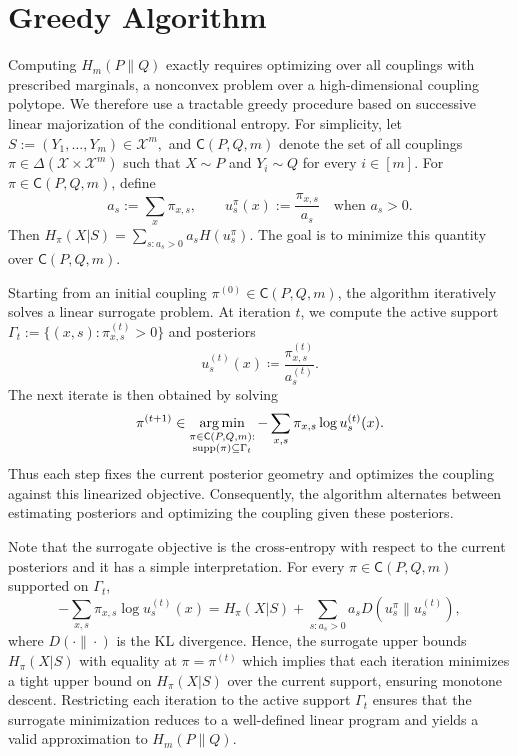 \documentclass[journal]{IEEEtran}
\def\argmin{\mathop{\rm arg\, min}}
\def\supp{\mathop{\rm supp}}
\def\argmin{\mathop{\rm arg\, min}}
\newcommand{\1}{\mathbf{1}}
\begin{document}
\section{Greedy Algorithm}
\label{sec:Hstar-algorithm}
Computing $H_m(P\|Q)$ exactly requires optimizing over all couplings with
prescribed marginals, a nonconvex problem over a high-dimensional coupling
polytope. We therefore use a tractable greedy procedure based on successive
linear majorization of the conditional entropy.
For simplicity, let \(S:=(Y_1,\ldots,Y_m)\in\mathcal X^m,\) and $\mathsf C(P,Q,m)$ denote the set of all couplings $\pi\in\Delta(\mathcal X\times\mathcal X^m)$ such that $X\sim P$ and $Y_i\sim Q$ for every $i\in[m]$. For $\pi\in\mathsf C(P,Q,m)$, define
\[a_s:=\sum_x\pi_{x,s},
\qquad u_s^\pi(x):=\frac{\pi_{x,s}}{a_s}
\quad\text{when }a_s>0.\]
Then \(H_\pi(X|S)=\sum_{s:a_s>0}a_sH(u_s^\pi).\) The goal is to minimize this quantity over $\mathsf C(P,Q,m)$.

Starting from an initial coupling $\pi^{(0)}\in\mathsf C(P,Q,m)$, the algorithm
iteratively solves a linear surrogate problem. At iteration $t$, we compute the active support \(\Gamma_t:=\{(x,s):\pi^{(t)}_{x,s}>0\}\) and posteriors 
\[u_s^{(t)}(x)\coloneqq \frac{\pi^{(t)}_{x,s}}{a_s^{(t)}}.\]
The next iterate is then obtained by solving 
\[\pi^{(t+1)}\in\argmin_{\substack{\pi\in\mathsf C(P,Q,m):\\
\supp(\pi)\subseteq\Gamma_t}} -\sum_{x,s}\pi_{x,s}\log u_s^{(t)}(x).\]
Thus each step fixes the current posterior geometry and optimizes the coupling
against this linearized objective. Consequently, the algorithm alternates between estimating posteriors and optimizing the coupling given these posteriors.

Note that the surrogate objective is the cross-entropy with respect to the current posteriors and it has a simple interpretation. For every
$\pi\in\mathsf C(P,Q,m)$ supported on $\Gamma_t$,
\[
-\sum_{x,s}\pi_{x,s}\log u_s^{(t)}(x)
=
H_\pi(X|S)
+
\sum_{s:a_s>0}a_sD(u_s^\pi\|u_s^{(t)}),
\]
where $D(\cdot\|\cdot)$ is the KL divergence.   Hence, the surrogate upper bounds $H_\pi(X|S)$ with equality at \(\pi=\pi^{(t)}\) which implies that each iteration minimizes a tight upper bound on $H_\pi(X|S)$ over the current
support, ensuring monotone descent. Restricting each iteration to the active support $\Gamma_t$ ensures that the surrogate minimization reduces to a well-defined linear program and yields a valid approximation to $H_m(P\|Q)$.
\end{document}

